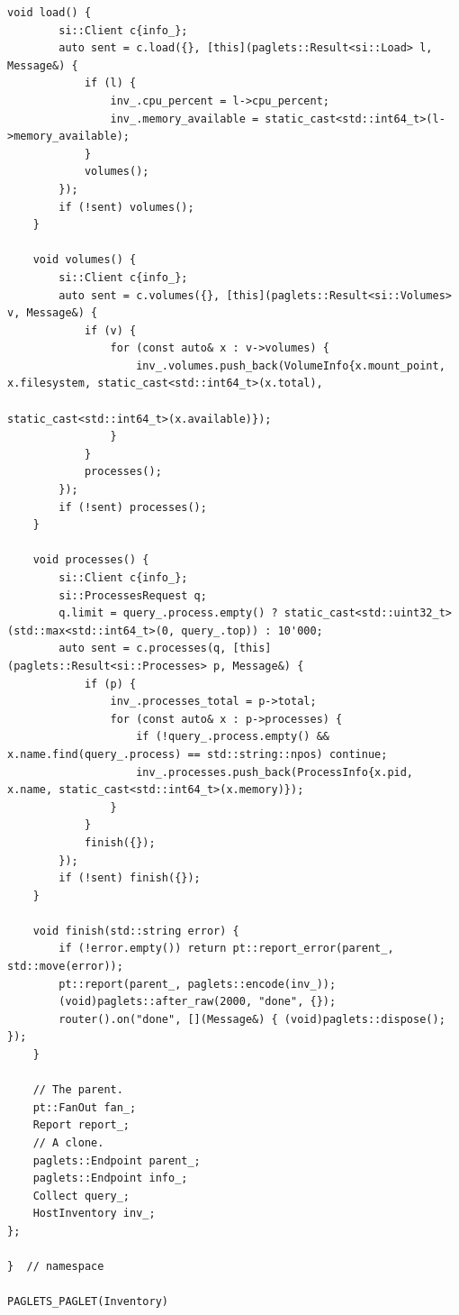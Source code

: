 \begin{lstlisting}[style=paglets-cpp,caption={The Inventory Collector \src{cpp/examples/inventory/inventory.cpp}},label={lst:app-inventory}]
    void load() {
        si::Client c{info_};
        auto sent = c.load({}, [this](paglets::Result<si::Load> l, Message&) {
            if (l) {
                inv_.cpu_percent = l->cpu_percent;
                inv_.memory_available = static_cast<std::int64_t>(l->memory_available);
            }
            volumes();
        });
        if (!sent) volumes();
    }

    void volumes() {
        si::Client c{info_};
        auto sent = c.volumes({}, [this](paglets::Result<si::Volumes> v, Message&) {
            if (v) {
                for (const auto& x : v->volumes) {
                    inv_.volumes.push_back(VolumeInfo{x.mount_point, x.filesystem, static_cast<std::int64_t>(x.total),
                                                      static_cast<std::int64_t>(x.available)});
                }
            }
            processes();
        });
        if (!sent) processes();
    }

    void processes() {
        si::Client c{info_};
        si::ProcessesRequest q;
        q.limit = query_.process.empty() ? static_cast<std::uint32_t>(std::max<std::int64_t>(0, query_.top)) : 10'000;
        auto sent = c.processes(q, [this](paglets::Result<si::Processes> p, Message&) {
            if (p) {
                inv_.processes_total = p->total;
                for (const auto& x : p->processes) {
                    if (!query_.process.empty() && x.name.find(query_.process) == std::string::npos) continue;
                    inv_.processes.push_back(ProcessInfo{x.pid, x.name, static_cast<std::int64_t>(x.memory)});
                }
            }
            finish({});
        });
        if (!sent) finish({});
    }

    void finish(std::string error) {
        if (!error.empty()) return pt::report_error(parent_, std::move(error));
        pt::report(parent_, paglets::encode(inv_));
        (void)paglets::after_raw(2000, "done", {});
        router().on("done", [](Message&) { (void)paglets::dispose(); });
    }

    // The parent.
    pt::FanOut fan_;
    Report report_;
    // A clone.
    paglets::Endpoint parent_;
    paglets::Endpoint info_;
    Collect query_;
    HostInventory inv_;
};

}  // namespace

PAGLETS_PAGLET(Inventory)
\end{lstlisting}

